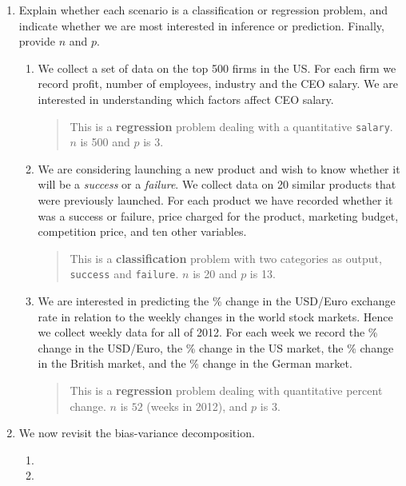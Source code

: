 \documentclass[11pt]{article}
\newenvironment{answer}{
\begin{quote}}{
\end{quote}}
\newcommand{\incfig}[1]{%
  \def\svgwidth{\columnwidth}
  {#1.pdf_tex}
}
\begin{document}
\begin{enumerate}
  \item Explain whether each scenario is a classification or
    regression problem, and indicate whether we are most interested
    in inference or prediction. Finally, provide $n$ and $p$.
    \begin{enumerate}
      \item We collect a set of data on the top 500 firms in the US. For each
        firm we record profit, number of employees, industry and the
        CEO salary. We are interested in understanding which factors
        affect CEO salary.

        \begin{answer}
          This is a \textbf{regression} problem dealing with a
          quantitative \texttt{salary}. $n$ is 500 and $p$ is 3.
        \end{answer}
      \item We are considering launching a new product and wish to know
        whether it will be a \textit{success} or a \textit{failure}.
        We collect data on 20 similar products that were previously
        launched. For each
        product we have recorded whether it was a success or failure, price
        charged for the product, marketing budget, competition price,
        and ten other variables.

        \begin{answer}
          This is a \textbf{classification} problem with two
          categories as output,
          \texttt{success} and \texttt{failure}. $n$ is 20 and $p$ is 13.
        \end{answer}
      \item We are interested in predicting the \% change in the USD/Euro
        exchange rate in relation to the weekly changes in the world
        stock markets. Hence we collect weekly data for all of 2012. For
        each week we record the \% change in the USD/Euro, the \%
        change in the US market, the \% change in the British market,
        and the \% change in the German market.

        \begin{answer}
          This is a \textbf{regression} problem dealing with
          quantitative percent change. $n$ is $52$ (weeks in 2012),
          and $p$ is 3.
        \end{answer}
    \end{enumerate}

  \item We now revisit the bias-variance decomposition.
    \begin{enumerate}
      \item
      \item
    \end{enumerate}


\end{enumerate}
\end{document}
